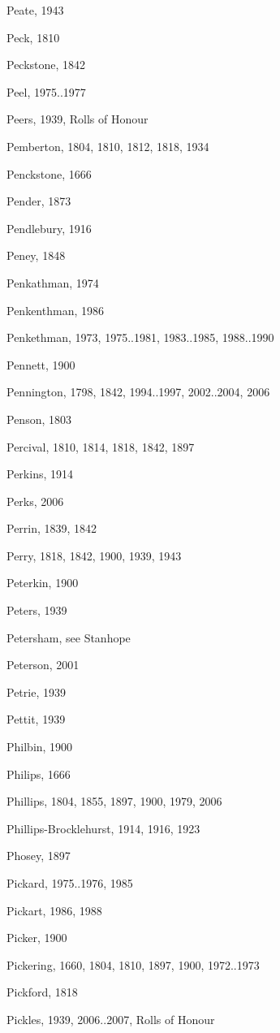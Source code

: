 {\begin{theindex}
\item Peate, 1943
\item Peck, 1810
\item Peckstone, 1842
\item Peel, 1975..1977
\item Peers, 1939, Rolls of Honour
\item Pemberton, 1804, 1810, 1812, 1818, 1934
\item Penckstone, 1666
\item Pender, 1873
\item Pendlebury, 1916
\item Peney, 1848
\item Penkathman, 1974
\item Penkenthman, 1986
\item Penkethman, 1973, 1975..1981, 1983..1985, 1988..1990
\item Pennett, 1900
\item Pennington, 1798, 1842, 1994..1997, 2002..2004, 2006
\item Penson, 1803
\item Percival, 1810, 1814, 1818, 1842, 1897
\item Perkins, 1914
\item Perks, 2006
\item Perrin, 1839, 1842
\item Perry, 1818, 1842, 1900, 1939, 1943
\item Peterkin, 1900
\item Peters, 1939
\item Petersham, see Stanhope
\item Peterson, 2001
\item Petrie, 1939
\item Pettit, 1939
\item Philbin, 1900
\item Philips, 1666
\item Phillips, 1804, 1855, 1897, 1900, 1979, 2006
\item Phillips-Brocklehurst, 1914, 1916, 1923
\item Phosey, 1897
\item Pickard, 1975..1976, 1985
\item Pickart, 1986, 1988
\item Picker, 1900
\item Pickering, 1660, 1804, 1810, 1897, 1900, 1972..1973
\item Pickford, 1818
\item Pickles, 1939, 2006..2007, Rolls of Honour

\end{theindex}}
